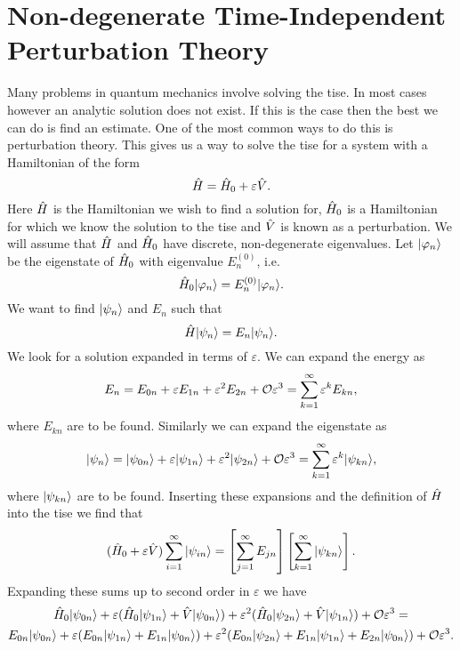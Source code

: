 \section{Non-degenerate Time-Independent Perturbation Theory}
Many problems in quantum mechanics involve solving the \gls{tise}.
In most cases however an analytic solution does not exist.
If this is the case then the best we can do is find an estimate.
One of the most common ways to do this is perturbation theory.
This gives us a way to solve the \gls{tise} for a system with a Hamiltonian of the form
\[\hat{H} = \hat{H}_0 + \varepsilon\hat{V}.\]
Here \(\hat{H}\) is the Hamiltonian we wish to find a solution for, \(\hat{H}_0\) is a Hamiltonian for which we know the solution to the \gls{tise} and \(\hat{V}\) is known as a perturbation.
We will assume that \(\hat{H}\) and \(\hat{H}_0\) have discrete, non-degenerate eigenvalues.
Let \(\vert {\varphi_n} \rangle\) be the eigenstate of \(\hat{H}_0\) with eigenvalue \(E_n^{(0)}\), i.e.
\[\hat{H}_0\vert {\varphi_n} \rangle = E_n^{(0)}\vert {\varphi_n} \rangle.\]
We want to find \(\vert {\psi_n} \rangle\) and \(E_n\) such that
\[\hat{H}\vert {\psi_n} \rangle = E_n\vert {\psi_n} \rangle.\]
We look for a solution expanded in terms of \(\varepsilon\).
We can expand the energy as
\[E_n = E_{0n} + \varepsilon E_{1n} + \varepsilon^2E_{2n} + \mathcal{O}{\varepsilon^3} = \sum_{k=1}^{\infty} \varepsilon^kE_{kn},\]
where \(E_{kn}\) are to be found.
Similarly we can expand the eigenstate as
\[\vert {\psi_n} \rangle = \vert {\psi_{0n}} \rangle + \varepsilon\vert {\psi_{1n}} \rangle + \varepsilon^2\vert {\psi_{2n}} \rangle + \mathcal{O}{\varepsilon^3} = \sum_{k=1}^{\infty} \varepsilon^k\vert {\psi_{kn}} \rangle,\]
where \(\vert {\psi_{kn}} \rangle\) are to be found.
Inserting these expansions and the definition of \(\hat{H}\) into the \gls{tise} we find that
\[(\hat{H}_0 + \varepsilon\hat{V})\sum_{i=1}^{\infty}\vert {\psi_{in}} \rangle = \left[\sum_{j=1}^{\infty}E_{jn}\right]\left[\sum_{k=1}^{\infty}\vert {\psi_{kn}} \rangle\right].\]
Expanding these sums up to second order in \(\varepsilon\) we have
\begin{multline*}
    \hat{H}_0\vert {\psi_{0n}} \rangle + \varepsilon(\hat{H}_0\vert {\psi_{1n}} \rangle + \hat{V}\vert {\psi_{0n}} \rangle) + \varepsilon^2(\hat{H}_0\vert {\psi_{2n}} \rangle + \hat{V}\vert {\psi_{1n}} \rangle) + \mathcal{O}{\varepsilon^3} =\\
    E_{0n}\vert {\psi_{0n}} \rangle + \varepsilon(E_{0n}\vert {\psi_{1n}} \rangle + E_{1n}\vert {\psi_{0n}} \rangle) + \varepsilon^2(E_{0n}\vert {\psi_{2n}} \rangle + E_{1n}\vert {\psi_{1n}} \rangle + E_{2n}\vert {\psi_{0n}} \rangle) + \mathcal{O}{\varepsilon^3}.
\end{multline*}
